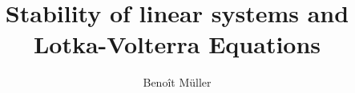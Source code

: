 \documentclass[a4paper]{report}
\title{Stability of linear systems and Lotka-Volterra Equations}
\author{Benoît Müller}
\date{}
\theoremstyle{definition}
\theoremstyle{remark}
\begin{document}
    \maketitle
    \tableofcontents
    
    
    
    
    \nocite{*}
    \printbibliography
\end{document}

